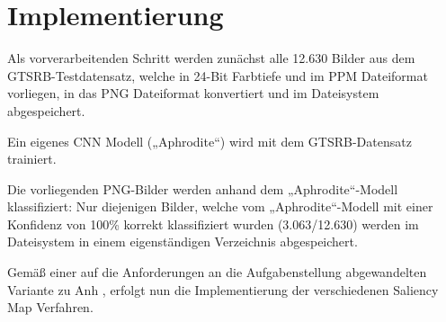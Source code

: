 %
%
%
%

\section{Implementierung}

Als vorverarbeitenden Schritt werden zunächst alle 12.630 Bilder aus dem GTSRB-Testdatensatz, welche in 24-Bit Farbtiefe und im \ac{PPM} Dateiformat vorliegen, in das \ac{PNG} Dateiformat konvertiert und im Dateisystem abgespeichert.


Ein eigenes \ac{CNN} Modell („Aphrodite“) wird mit dem \ac{GTSRB}-Datensatz trainiert.

Die  vorliegenden \ac{PNG}-Bilder werden anhand dem „Aphrodite“-Modell klassifiziert:
Nur diejenigen Bilder, welche vom „Aphrodite“-Modell mit einer Konfidenz von 100\% korrekt klassifiziert wurden (3.063/12.630) werden im Dateisystem in einem eigenständigen Verzeichnis abgespeichert.


Gemäß einer auf die Anforderungen an die Aufgabenstellung abgewandelten Variante zu Anh \cite{anh_implementations_2019}, erfolgt nun die Implementierung der verschiedenen Saliency Map Verfahren.


